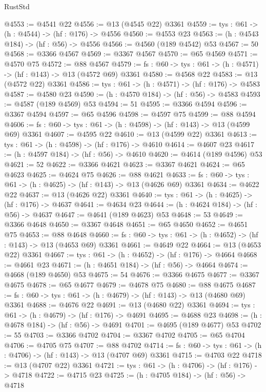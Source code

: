 \begin{lexlean}{RustStd}
\begin{coremodule}
@4553 := @4541 @22
@4556 := @13 (@4545 @22) @3361
@4559 := {tys : @61} -> (h : @4544) -> (hf : @176) -> @4556
@4560 := @4553 @23
@4563 := (h : @4543 @184) -> (hf : @56) -> @4556
@4566 := @4560 (@189 @4542) @53
@4567 := 50
@4568 := @3366 @4567
@4569 := @3367 @4567
@4570 := @65 @4569
@4571 := @4570 @75
@4572 := @88 @4567
@4579 := {fs : @60} -> {tys : @61} -> (h : @4571) -> (hf : @143) -> @13 (@4572 @69) @3361
@4580 := @4568 @22
@4583 := @13 (@4572 @22) @3361
@4586 := {tys : @61} -> (h : @4571) -> (hf : @176) -> @4583
@4587 := @4580 @23
@4590 := (h : @4570 @184) -> (hf : @56) -> @4583
@4593 := @4587 (@189 @4569) @53
@4594 := 51
@4595 := @3366 @4594
@4596 := @3367 @4594
@4597 := @65 @4596
@4598 := @4597 @75
@4599 := @88 @4594
@4606 := {fs : @60} -> {tys : @61} -> (h : @4598) -> (hf : @143) -> @13 (@4599 @69) @3361
@4607 := @4595 @22
@4610 := @13 (@4599 @22) @3361
@4613 := {tys : @61} -> (h : @4598) -> (hf : @176) -> @4610
@4614 := @4607 @23
@4617 := (h : @4597 @184) -> (hf : @56) -> @4610
@4620 := @4614 (@189 @4596) @53
@4621 := 52
@4622 := @3366 @4621
@4623 := @3367 @4621
@4624 := @65 @4623
@4625 := @4624 @75
@4626 := @88 @4621
@4633 := {fs : @60} -> {tys : @61} -> (h : @4625) -> (hf : @143) -> @13 (@4626 @69) @3361
@4634 := @4622 @22
@4637 := @13 (@4626 @22) @3361
@4640 := {tys : @61} -> (h : @4625) -> (hf : @176) -> @4637
@4641 := @4634 @23
@4644 := (h : @4624 @184) -> (hf : @56) -> @4637
@4647 := @4641 (@189 @4623) @53
@4648 := 53
@4649 := @3366 @4648
@4650 := @3367 @4648
@4651 := @65 @4650
@4652 := @4651 @75
@4653 := @88 @4648
@4660 := {fs : @60} -> {tys : @61} -> (h : @4652) -> (hf : @143) -> @13 (@4653 @69) @3361
@4661 := @4649 @22
@4664 := @13 (@4653 @22) @3361
@4667 := {tys : @61} -> (h : @4652) -> (hf : @176) -> @4664
@4668 := @4661 @23
@4671 := (h : @4651 @184) -> (hf : @56) -> @4664
@4674 := @4668 (@189 @4650) @53
@4675 := 54
@4676 := @3366 @4675
@4677 := @3367 @4675
@4678 := @65 @4677
@4679 := @4678 @75
@4680 := @88 @4675
@4687 := {fs : @60} -> {tys : @61} -> (h : @4679) -> (hf : @143) -> @13 (@4680 @69) @3361
@4688 := @4676 @22
@4691 := @13 (@4680 @22) @3361
@4694 := {tys : @61} -> (h : @4679) -> (hf : @176) -> @4691
@4695 := @4688 @23
@4698 := (h : @4678 @184) -> (hf : @56) -> @4691
@4701 := @4695 (@189 @4677) @53
@4702 := 55
@4703 := @3366 @4702
@4704 := @3367 @4702
@4705 := @65 @4704
@4706 := @4705 @75
@4707 := @88 @4702
@4714 := {fs : @60} -> {tys : @61} -> (h : @4706) -> (hf : @143) -> @13 (@4707 @69) @3361
@4715 := @4703 @22
@4718 := @13 (@4707 @22) @3361
@4721 := {tys : @61} -> (h : @4706) -> (hf : @176) -> @4718
@4722 := @4715 @23
@4725 := (h : @4705 @184) -> (hf : @56) -> @4718

\end{coremodule}
\end{lexlean}
